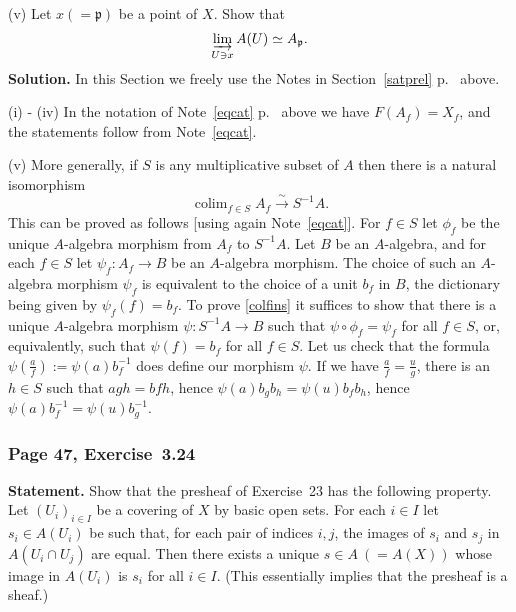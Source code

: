 \documentclass[12pt,letterpaper]{article}%
\newcommand{\mf}{\mathfrak}
\newcommand{\ppp}{\mf p}
\DeclareMathOperator*{\colim}{colim}
\newcommand{\nn}{\noindent}
\begin{document}
\nn(v) Let $x(=\ppp)$ be a point of $X$. Show that
$$
\varinjlim_{U\ni x}A(U)\simeq A_\ppp.
$$
\nn\textbf{Solution.} In this Section we freely use the Notes in Section~\ref{satprel} p.~\pageref{satprel} above.

\nn(i) - (iv) In the notation of Note~\ref{eqcat} p.~\pageref{eqcat} above we have $F(A_f)=X_f$, and the statements follow from Note~\ref{eqcat}.

\nn(v) More generally, if $S$ is any multiplicative subset of $A$ then there is a natural isomorphism 
\begin{equation}\label{colfins}
\colim_{f\in S}A_f\xrightarrow{\sim}S^{-1}A.
\end{equation}
This can be proved as follows [using again Note~\ref{eqcat}]. For $f\in S$ let $\phi_f$ be the unique $A$-algebra morphism from $A_f$ to $S^{-1}A$. Let $B$ be an $A$-algebra, and for each $f\in S$ let $\psi_f:A_f\to B$ be an $A$-algebra morphism. The choice of such an $A$-algebra morphism $\psi_f$ is equivalent to the choice of a unit $b_f$ in $B$, the dictionary being given by $\psi_f(f)=b_f$. To prove \eqref{colfins} it suffices to show that there is a unique $A$-algebra morphism $\psi:S^{-1}A\to B$ such that $\psi\circ\phi_f=\psi_f$ for all $f\in S$, or, equivalently, such that $\psi(f)=b_f$ for all $f\in S$. Let us check that the formula $\psi(\frac af):=\psi(a)b_f^{-1}$ does define our morphism $\psi$. If we have $\frac af=\frac ug$, there is an $h\in S$ such that $agh=bfh$, hence $\psi(a)b_gb_h=\psi(u)b_fb_h$, hence $\psi(a)b_f^{-1}=\psi(u)b_g^{-1}$.


\subsubsection{Page 47, Exercise~3.24}%

\textbf{Statement.} Show that the presheaf of Exercise~23 has the following property. Let $(U_i)_{i\in I}$ be a covering of $X$ by basic open sets. For each $i\in I$ let $s_i\in A(U_i)$ be such that, for each pair of indices $i,j$, the images of $s_i$ and $s_j$ in $A(U_i\cap U_j)$ are equal. Then there exists a unique $s\in A\ (=A(X))$ whose image in $A(U_i)$ is $s_i$ for all $i\in I$. (This essentially implies that the presheaf is a sheaf.)
\end{document}
